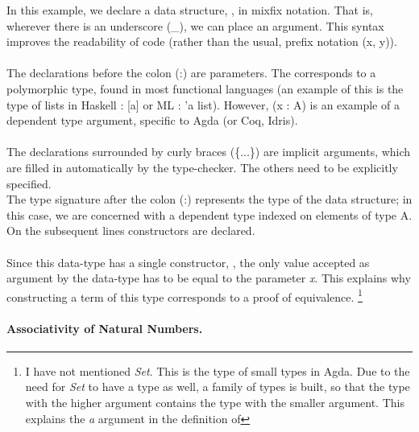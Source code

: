 \documentclass[12pt,twoside,notitlepage]{report}
\begin{document}
In this example, we declare a data structure, , in mixfix notation. That is, wherever there is an underscore (\_), we can place an argument. This syntax improves the readability of code (rather than the usual, prefix notation (x, y)).\\\\
The declarations before the colon (:) are parameters. The \AgdaSymbol{\{} \AgdaSymbol{:}  \AgdaSymbol{\}} corresponds to a polymorphic type, found in most functional languages (an example of this is the type of lists in Haskell : [a] or ML : 'a list). However, (x : A) is an example of a dependent type argument, specific to Agda (or Coq, Idris). \\\\
The declarations surrounded by curly braces (\{...\}) are implicit arguments, which are filled in automatically by the type-checker. The others need to be explicitly specified.\\
The type signature after the colon (:) represents the type of the data structure; in this case, we are concerned with a dependent type indexed on elements of type A. On the subsequent lines constructors are declared. \\\\
Since this data-type has a single constructor, , the only value accepted as argument by the data-type has to be equal to the parameter \textit{x}. This explains why constructing a term of this type corresponds to a proof of equivalence. \footnote{I have not mentioned \textit{Set}. This is the type of small types in Agda. Due to the need for \textit{Set} to have a type as well, a family of types is built, so that the type with the higher argument contains the type with the smaller argument. This explains the \textit{a} argument in the definition of }

\paragraph{Associativity of Natural Numbers.}
\end{document}

